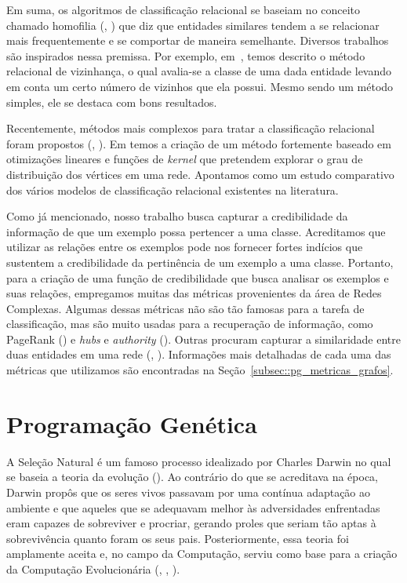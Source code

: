 Em suma, os algoritmos de classificação relacional se baseiam no conceito chamado homofilia (\cite{Blau77}, \cite{Mcpherson01})
que diz que 
entidades similares tendem a se relacionar mais frequentemente e se comportar de maneira semelhante.
Diversos trabalhos são inspirados nessa premissa. Por exemplo, em~\cite{Macskassy04}, temos descrito o método relacional de vizinhança, o qual avalia-se 
a classe de uma dada entidade levando em conta um certo número de vizinhos que ela possui. Mesmo sendo um método simples, ele se destaca com bons resultados.

Recentemente, métodos mais complexos para tratar a classificação relacional foram propostos (\cite{Zhang08}, \cite{Lu03}).
Em \cite{Zhang08} temos a criação de um método fortemente baseado em otimizações lineares e funções de \textit{kernel} que pretendem explorar o grau de distribuição dos vértices em uma rede. Apontamos \cite{Lu03} como um estudo comparativo dos vários modelos de classificação relacional existentes na literatura.

Como já mencionado, nosso trabalho busca capturar a credibilidade da informação de que um exemplo possa pertencer a uma classe. Acreditamos que utilizar as relações entre os exemplos pode nos fornecer fortes indícios que sustentem a credibilidade da pertinência de um exemplo a uma classe.
Portanto, para a criação de uma função de credibilidade que busca analisar os exemplos e suas relações, empregamos muitas das métricas provenientes da área de Redes Complexas. 
Algumas dessas métricas não são tão famosas para a tarefa de classificação, mas são muito usadas para a recuperação de informação, como PageRank (\cite{Page98}) e \textit{hubs} e \textit{authority} (\cite{Kleinberg99}). Outras procuram capturar a similaridade entre duas entidades em uma rede (\cite{Jaccard01}, \cite{Adamic03}).
Informações mais detalhadas de cada uma das métricas que utilizamos são encontradas na Seção~\ref{subsec::pg_metricas_grafos}.

\section{Programação Genética}
\label{sec::pg}

A Seleção Natural é um famoso processo idealizado por Charles Darwin no qual se baseia a teoria da evolução (\cite{Darwin1859}). Ao contrário do que se acreditava na época, Darwin propôs que os seres vivos passavam por uma contínua adaptação ao ambiente e que aqueles que se adequavam melhor às adversidades enfrentadas eram capazes de sobreviver e procriar, gerando proles que seriam tão aptas à sobrevivência quanto foram os seus pais. 
Posteriormente, essa teoria foi amplamente aceita e, no campo da Computação, serviu como base para a criação da Computação Evolucionária (\cite{Barricelli55}, \cite{Rechenberg73}, \cite{Goldberg89}).

